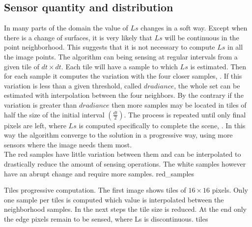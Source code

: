 \documentclass[10pt, conference]{IEEEtran}
\begin{document}
\subsection{Sensor quantity and distribution}
In many parts of the domain the value of $Ls$ changes in a soft way. 
Except when there is a change of surfaces, it is very likely that $Ls$ will be continuous in the point neighborhood. 
This suggests that it is not necessary to compute $Ls$ in all the image points. 
The algorithm can being sensing at regular intervals from a given tile of $dt \times dt$. 
Each tile will have a sample to which $Ls$ is estimated. Then for each sample it computes the variation with the four closer samples, . 
If this variation is less than a given threshold, called $dradiance$, the whole set can be estimated with interpolation between the four neighbors. 
By the contrary if the variation is greater than $dradiance$ then more samples may be located in tiles of half the size of the initial interval $(\frac{dt}{2})$. 
The process is repeated until only final pixels are left, where $Ls$ is computed specifically to complete the scene, .
In this way the algorithm converge to the solution in a progressive way, using more sensors where the image needs them most.\\

\subimages
	{The red samples have little variation between them and can be interpolated to drastically reduce the amount of sensing operations. 
	The white samples however have an abrupt change and require more samples.}
	{red_samples}{
}

\subimages
	{Tiles progressive computation. The first image shows tiles of $16 \times 16$ pixels. 
	Only one sample per tiles is computed which value is interpolated between the neighborhood samples. 
	In the next steps the tile size is reduced. At the end only the edge pixels remain to be sensed, where Ls is discontinuous.}
	{tiles}{
}


\end{document}

